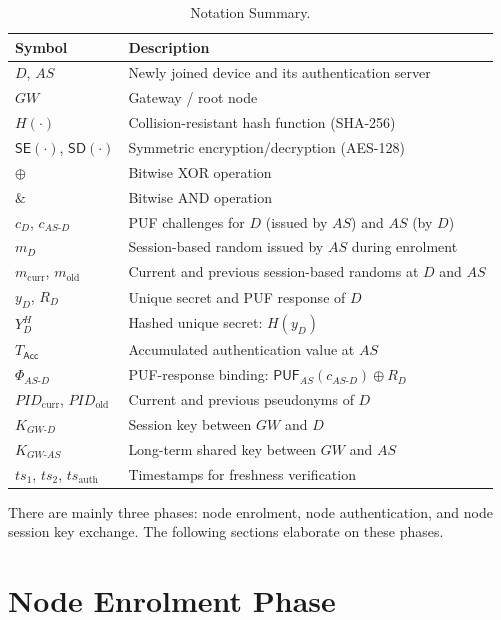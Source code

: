 \documentclass[12pt,a4paper]{report}
\begin{document}
\begin{table}[!ht]
  \centering
  \caption{Notation Summary.}
  \label{tab:notations}
  \small
  \setlength{\tabcolsep}{8pt}
  \begin{tabular}{ll}
    \toprule
    Symbol & Description \\
    \midrule
    $D$, $AS$ & Newly joined device and its authentication server \\
    $GW$ & Gateway / root node \\
    $H(\cdot)$ & Collision-resistant hash function (SHA-256) \\
    $\mathsf{SE}(\cdot)$, $\mathsf{SD}(\cdot)$ & Symmetric encryption/decryption (AES-128) \\
    $\oplus$ & Bitwise XOR operation \\
    $\mathbin{\&}$ & Bitwise AND operation \\
    $c_D$, $c_{AS\text{-}D}$ & PUF challenges for $D$ (issued by $AS$) and $AS$ (by $D$) \\
    $m_D$ & Session-based random issued by $AS$ during enrolment \\
    $m_{\mathrm{curr}}$, $m_{\mathrm{old}}$ & Current and previous session-based randoms at $D$ and $AS$ \\
    $y_D$, $R_D$ & Unique secret and PUF response of $D$ \\
    $Y_D^H$ & Hashed unique secret: $H(y_D)$ \\
    $T_\mathsf{Acc}$ & Accumulated authentication value at $AS$ \\
    $\Phi_{AS\text{-}D}$ & PUF-response binding: $\mathsf{PUF}_{AS}(c_{AS\text{-}D}) \oplus R_D$ \\
    $\mathit{PID}_{\mathrm{curr}}$, $\mathit{PID}_{\mathrm{old}}$ & Current and previous pseudonyms of $D$ \\
    $K_{GW\text{-}D}$ & Session key between $GW$ and $D$ \\
    $K_{GW\text{-}AS}$ & Long-term shared key between $GW$ and $AS$ \\
    $ts_1$, $ts_2$, $ts_{\mathrm{auth}}$ & Timestamps for freshness verification \\
    \bottomrule
  \end{tabular}
\end{table}

There are mainly three phases: node enrolment, node authentication, and node session
key exchange.
The following sections elaborate on these phases.

\section{Node Enrolment Phase}
\end{document}
